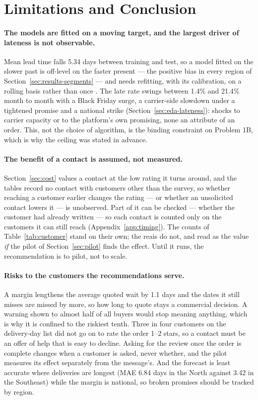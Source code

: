 \section{Limitations and Conclusion}
\label{sec:limitations}

\paragraph{The models are fitted on a moving target, and the largest driver of
lateness is not observable.} Mean lead time falls 5.34 days between training and
test, so a model fitted on the slower past is off-level on the faster present ---
the positive bias in every region of Section~\ref{sec:results-segments} --- and
needs refitting, with its calibration, on a rolling basis rather than once
\citep{gama2014drift}. The late rate swings between 1.4\% and 21.4\% month to
month with a Black Friday surge, a carrier-side slowdown under a tightened
promise and a national strike (Section~\ref{sec:eda-lateness}): shocks to carrier
capacity or to the platform's own promising, none an attribute of an order. This,
not the choice of algorithm, is the binding constraint on Problem 1B, which is
why the ceiling was stated in advance.

\paragraph{The benefit of a contact is assumed, not measured.}
Section~\ref{sec:cost} values a contact at the low rating it turns around, and
the tables record no contact with customers other than the survey, so whether
reaching a customer earlier changes the rating --- or whether an unsolicited
contact lowers it --- is unobserved. Part of it can be checked --- whether the
customer had already written --- so each contact is counted only on the
customers it can still reach (Appendix~\ref{app:timing}).
The counts of Table~\ref{tab:customer} stand on their own; the reais do not, and
read as the value \emph{if} the pilot of Section~\ref{sec:pilot} finds the
effect. Until it runs, the recommendation is to pilot, not to scale.

\paragraph{Risks to the customers the recommendations serve.}
A margin lengthens the average quoted wait by 1.1 days and the dates it still
misses are missed by more, so how long to quote stays a commercial decision. A
warning shown to almost half of all buyers would stop meaning anything, which is
why it is confined to the riskiest tenth. Three in four customers on the
delivery-day list did not go on to rate the order 1--2 stars, so a contact must
be an offer of help that is easy to decline. Asking for the review once the order is complete
changes when a customer is asked, never whether, and the pilot measures its effect
separately from the message's. And the forecast is least accurate where deliveries
are longest (MAE 6.84 days in the North against 3.42 in the Southeast) while the
margin is national, so broken promises should be tracked by region.

